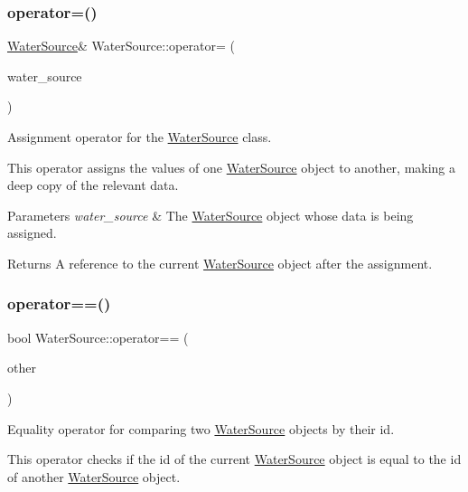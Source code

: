 \subsubsection{\texorpdfstring{operator=()}{operator=()}}
{\footnotesize\ttfamily \mbox{\hyperlink{classWaterSource}{Water\+Source}}\& Water\+Source\+::operator= (\begin{DoxyParamCaption}\item[{const \mbox{\hyperlink{classWaterSource}{Water\+Source}} \&}]{water\+\_\+source }\end{DoxyParamCaption})}



Assignment operator for the {\ttfamily \mbox{\hyperlink{classWaterSource}{Water\+Source}}} class. 

This operator assigns the values of one {\ttfamily \mbox{\hyperlink{classWaterSource}{Water\+Source}}} object to another, making a deep copy of the relevant data.


\begin{DoxyParams}{Parameters}
{\em water\+\_\+source} & The {\ttfamily \mbox{\hyperlink{classWaterSource}{Water\+Source}}} object whose data is being assigned.\\
\hline
\end{DoxyParams}
\begin{DoxyReturn}{Returns}
A reference to the current {\ttfamily \mbox{\hyperlink{classWaterSource}{Water\+Source}}} object after the assignment. 
\end{DoxyReturn}
\mbox{\label{classWaterSource_af25e06ec954898f3392cb125d2f2c2ad}} 
\subsubsection{\texorpdfstring{operator==()}{operator==()}}
{\footnotesize\ttfamily bool Water\+Source\+::operator== (\begin{DoxyParamCaption}\item[{const \mbox{\hyperlink{classWaterSource}{Water\+Source}} $\ast$}]{other }\end{DoxyParamCaption})}



Equality operator for comparing two {\ttfamily \mbox{\hyperlink{classWaterSource}{Water\+Source}}} objects by their {\ttfamily id}. 

This operator checks if the {\ttfamily id} of the current {\ttfamily \mbox{\hyperlink{classWaterSource}{Water\+Source}}} object is equal to the {\ttfamily id} of another {\ttfamily \mbox{\hyperlink{classWaterSource}{Water\+Source}}} object.


